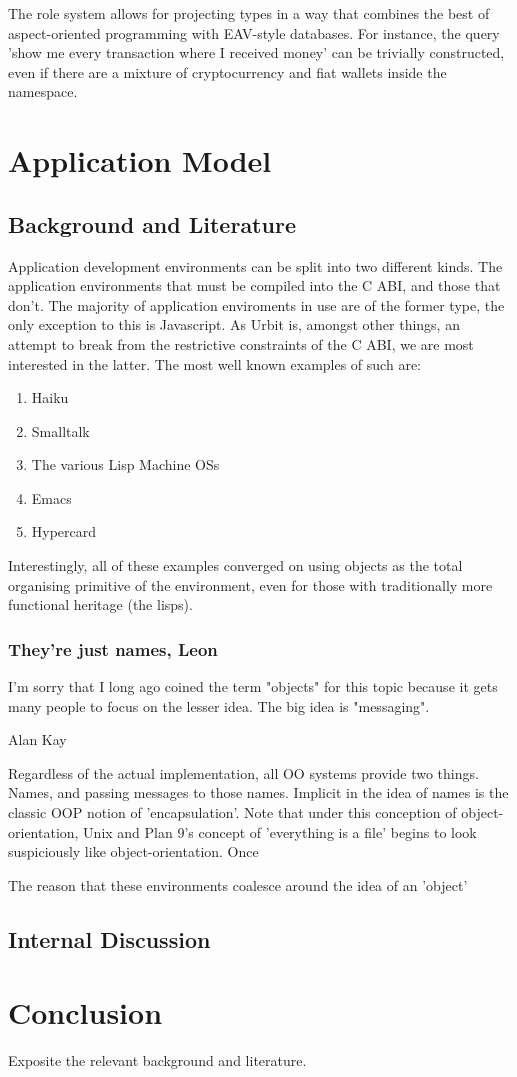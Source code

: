 \documentclass[twoside]{report}
\begin{document}
The role system allows for projecting types in a way that combines the best of aspect-oriented programming with EAV-style databases. For instance, the query 'show me every transaction where I received money' can be trivially constructed, even if there are a mixture of cryptocurrency and fiat wallets inside the namespace.


\chapter{Application Model}

\section{Background and Literature}

Application development environments can be split into two different kinds. The application environments that must be compiled into the C ABI, and those that don't. The majority of application enviroments in use are of the former type, the only exception to this is Javascript. As Urbit is, amongst other things, an attempt to break from the restrictive constraints of the C ABI, we are most interested in the latter. The most well known examples of such are:

\begin{enumerate}
  \item Haiku
  \item Smalltalk
  \item The various Lisp Machine OSs
  \item Emacs
  \item Hypercard
\end{enumerate}

Interestingly, all of these examples converged on using objects as the total organising primitive of the environment, even for those with traditionally more functional heritage (the lisps).

\subsection{They're just names, Leon}

\epigraph{I'm sorry that I long ago coined the term "objects" for this topic because it gets many people to focus on the lesser idea. The big idea is "messaging".}{Alan Kay}

Regardless of the actual implementation, all OO systems provide two things. Names, and passing messages to those names. Implicit in the idea of names is the classic OOP notion of 'encapsulation'. Note that under this conception of object-orientation, Unix and Plan 9's concept of 'everything is a file' begins to look suspiciously like object-orientation. Once

The reason that these environments coalesce around the idea of an 'object'

\section{Internal Discussion}


\chapter{Conclusion}


Exposite the relevant background and literature.


\printbibliography
\end{document}
